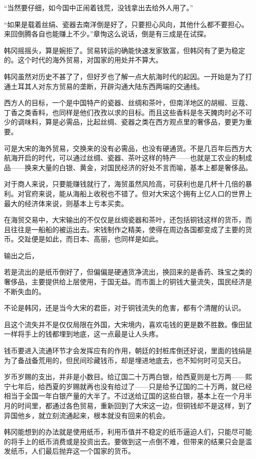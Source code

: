 “当然要仔细，如今国中正闹着钱荒，没钱拿出去给外人用了。”

“如果是载着丝绢、瓷器去南洋倒是好了，只要担心风向，其他什么都不要担心。来回倒腾各自也能赚上不少。”章恂这么说话，倒是有三成是在试探。

韩冈摇摇头，算是婉拒了。贸易转运的确能快速发家致富，但韩冈有了更为稳定的。这个时代的海外贸易，对国家的用处并不算大。

韩冈虽然对历史不甚了了，但好歹也了解一点大航海时代的起因。一开始是为了打通土耳其人对东方贸易的垄断，开辟沟通大陆东西两端的交通线。

西方人的目标，一个是中国特产的瓷器、丝绸和茶叶，但南洋地区的胡椒、豆蔻、丁香之类香料，也同样是他们孜孜以求的目标。而且这些香料是冬天腌肉时必不可少的调味料，算是必需品，比起丝绸、瓷器之类在西方观点里的奢侈品，要更为重要。

可是大宋的海外贸易，交换来的没有必需品，也没有硬通货。不是几百年后西方大航海开启的时代，可以通过丝绸、瓷器、茶叶这样的特产——也就是工农业的制成品——换来大量的白银、黄金，对国民经济的好处不言而喻，基本上都是奢侈品。

对于商人来说，只要能赚钱就行了，海贸虽然风险高，可获利也是几杯十几倍的暴利。对官府来说，能从海船上收税也不错了。但对大宋这个拥有上亿人口的世界上最大的经济体来说，则基本上亏本买卖。

在海贸交易中，大宋输出的不仅仅是丝绸瓷器和茶叶，还包括铜钱这样的货币，而且往往是一船船的被运出去。宋钱制作之精美，使得在周边各国都变成了主要的货币。交趾便是如此，而日本、高丽，也同样是如此。

输出之后，

若是流出的是纸币倒好了，但偏偏是硬通货净流出，换回来的是香药、珠宝之类的奢侈品，主要提供给上层使用，于国无益。而市面上的铜钱大量流失，国民经济是不断失血的。

不论是韩冈，还是当今大宋的君臣，对于铜钱流失的危害，都有个清醒的认识。

且这个流失并不是仅仅局限在外国，大宋境内，喜欢屯钱的更是数不胜数。像田鼠一样将手上的钱都埋到地底，这一点最是让人头疼。

钱币要进入流通环节才会发挥应有的作用，朝廷的封桩库倒还好说，里面的钱绢是为了备战备荒用的，但民间珍藏钱币，却是埋进地底去，也不知何时可见天日。

岁币岁赐的支出，并非是小数目。给辽国二十万两白银，给西夏则是七万两——熙宁七年后，给西夏的岁赐就再也没有给过了——只是给予辽国的二十万两，就已经相当于全国一年白银产量的大半了。不过送给辽国的这些白银，基本上在一个月半月的时间里，都通过各色贸易，重新回到了大宋这一边，但铜钱却不是这样，到了异国他乡，就立刻流通起来，根本就没有回来的机会。

韩冈能想到的办法就是使用纸币，利用币值并不稳定的纸币逼迫人们，只能尽可能的将手上的纸币消费或是投资出去。要做到这一点倒不难，但带来的结果只会是滥发纸币，人们最后抛弃这一个国家的货币。

